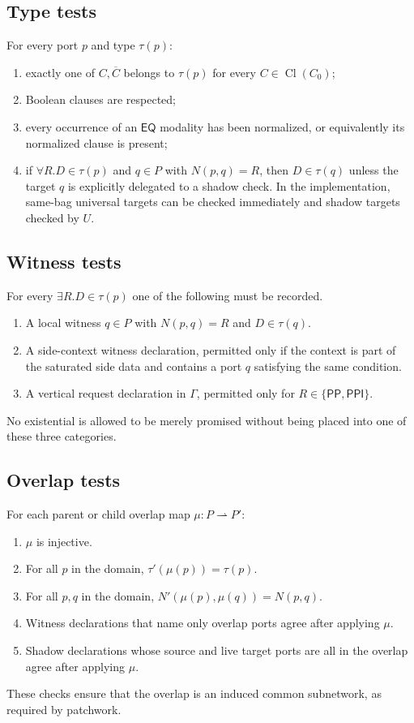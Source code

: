 \documentclass[11pt]{article}
\newcommand{\EQ}{\mathsf{EQ}}
\newcommand{\PP}{\mathsf{PP}}
\newcommand{\PPI}{\mathsf{PPI}}
\newcommand{\Cl}{\operatorname{Cl}}
\begin{document}
\subsection{Type tests}

For every port $p$ and type $\tau(p)$:
\begin{enumerate}[label=(T\arabic*)]
\item exactly one of $C,\overline C$ belongs to $\tau(p)$ for every $C\in\Cl(C_0)$;
\item Boolean clauses are respected;
\item every occurrence of an $\EQ$ modality has been normalized, or equivalently its normalized clause is present;
\item if $\forall R.D\in\tau(p)$ and $q\in P$ with $N(p,q)=R$, then $D\in\tau(q)$ unless the target $q$ is explicitly delegated to a shadow check.  In the implementation, same-bag universal targets can be checked immediately and shadow targets checked by $U$.
\end{enumerate}

\subsection{Witness tests}

For every $\exists R.D\in\tau(p)$ one of the following must be recorded.
\begin{enumerate}[label=(W\arabic*)]
\item A local witness $q\in P$ with $N(p,q)=R$ and $D\in\tau(q)$.
\item A side-context witness declaration, permitted only if the context is part of the saturated side data and contains a port $q$ satisfying the same condition.
\item A vertical request declaration in $\Gamma$, permitted only for $R\in\{\PP,\PPI\}$.
\end{enumerate}
No existential is allowed to be merely promised without being placed into one of these three categories.

\subsection{Overlap tests}

For each parent or child overlap map $\mu:P\rightharpoonup P'$:
\begin{enumerate}[label=(O\arabic*)]
\item $\mu$ is injective.
\item For all $p$ in the domain, $\tau'(\mu(p))=\tau(p)$.
\item For all $p,q$ in the domain, $N'(\mu(p),\mu(q))=N(p,q)$.
\item Witness declarations that name only overlap ports agree after applying $\mu$.
\item Shadow declarations whose source and live target ports are all in the overlap agree after applying $\mu$.
\end{enumerate}
These checks ensure that the overlap is an induced common subnetwork, as required by patchwork.
\end{document}
